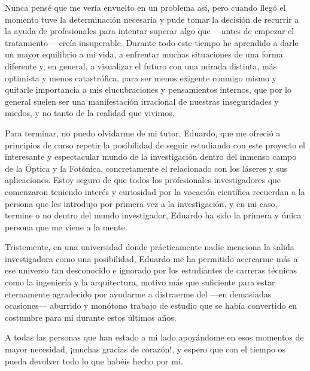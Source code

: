 Nunca pensé que me vería envuelto en un problema así, pero cuando llegó el momento tuve la determinación necesaria y pude tomar la decisión de recurrir a la ayuda de profesionales para intentar superar algo que ---antes de empezar el tratamiento--- creía insuperable. Durante todo este tiempo he aprendido a darle un mayor equilibrio a mi vida, a enfrentar muchas situaciones de una forma diferente y, en general, a visualizar el futuro con una mirada distinta, más optimista y menos catastrófica, para ser menos exigente conmigo mismo y quitarle importancia a mis elucubraciones y pensamientos internos, que por lo general suelen ser una manifestación irracional de nuestras inseguridades y miedos, y no tanto de la realidad que vivimos.

Para terminar, no puedo olvidarme de mi tutor, Eduardo, que me ofreció a principios de curso repetir la posibilidad de seguir estudiando con este proyecto el interesante y espectacular mundo de la investigación dentro del inmenso campo de la Óptica y la Fotónica, concretamente el relacionado con los láseres y sus aplicaciones. Estoy seguro de que todos los profesionales investigadores que comenzaron teniendo interés y curiosidad por la vocación científica recuerdan a la persona que les introdujo por primera vez a la investigación, y en mi caso, termine o no dentro del mundo investigador, Eduardo ha sido la primera y única persona que me viene a la mente. 

Tristemente, en una universidad donde prácticamente nadie menciona la salida investigadora como una posibilidad, Eduardo me ha permitido acercarme más a ese universo tan desconocido e ignorado por los estudiantes de carreras técnicas como la ingeniería y la arquitectura, motivo más que suficiente para estar eternamente agradecido por ayudarme a distraerme del ---en demasiadas ocasiones--- aburrido y monótono trabajo de estudio que se había convertido en costumbre para mí durante estos últimos años.

A todas las personas que han estado a mi lado apoyándome en esos momentos de mayor necesidad, ¡muchas gracias de corazón!, y espero que con el tiempo os pueda devolver todo lo que habéis hecho por mí.


